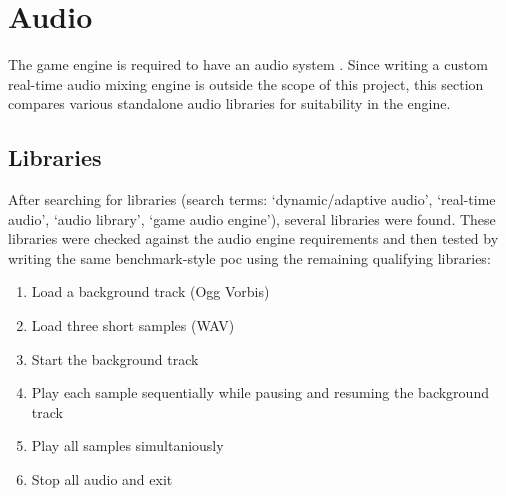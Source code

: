 \documentclass{projdoc}
\begin{document}
% 
% 
% 
% 
% 
% 
% 

\section{Audio}

The game engine is required to have an audio system
\autocite[\ref{req:audio}]{crepe:requirements}. Since writing a custom real-time
audio mixing engine is outside the scope of this project\mref, this section compares
various standalone audio libraries for suitability in the engine.

\subsection{Libraries}
\label{sec:audio:libs}

After searching for libraries (search terms: `dynamic/adaptive audio', `real-time
audio', `audio library', `game audio engine'), several libraries were found. These
libraries were checked against the audio engine requirements
\autocite{crepe:requirements} and then tested by writing the same benchmark-style
\gls{poc} using the remaining qualifying libraries:\noparbreak
\begin{enumerate}
	\item Load a background track (Ogg Vorbis)
	\item Load three short samples (WAV)
	\item Start the background track
	\item Play each sample sequentially while pausing and resuming the background track
	\item Play all samples simultaniously
	\item Stop all audio and exit
\end{enumerate}
\end{document}
